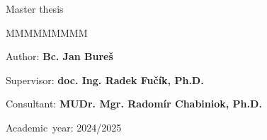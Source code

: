 {%
\vspace{2cm}

{\large{}Master thesis}{\large\par}
\vfill{}

\begin{lyxlist}{MMMMMMMMM}
	\begin{singlespace}
		\item [{Author:}] \textbf{Bc. Jan Bureš}
		\item [{Supervisor:}] \textbf{doc. Ing. Radek Fučík, Ph.D.}
		\item [{Consultant:}] \textbf{MUDr. Mgr. Radomír Chabiniok, Ph.D.}
		\item [{Academic~year:}] 2024/2025
	\end{singlespace}
\end{lyxlist}
\newpage{}
}



~\newpage{}

